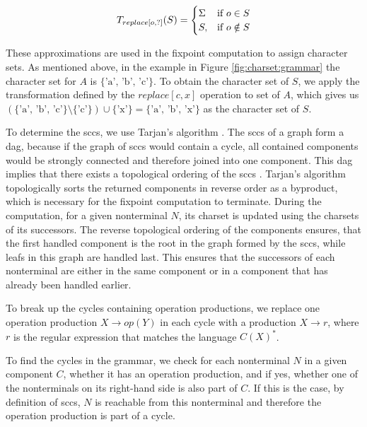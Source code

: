 \begin{align}
	\centering
	T_{replace[o, ?]}(S) = 
	\begin{cases}
		\Sigma & \text{if } o \in S\\
		S, & \text{if } o \notin S
	\end{cases}
	\label{math:replace:unknown}
\end{align}

These approximations are used in the fixpoint computation to assign character sets.
As mentioned above, in the example in Figure \ref{fig:charset:grammar} the character set for $A$ is $\{\text{'a', 'b', 'c'}\}$. To obtain the character set of $S$, we apply the transformation defined by the $replace[c,x]$ operation to set of $A$, which gives us $(\{\text{'a', 'b', 'c'}\} \setminus \{\text{'c'}\}) \cup \{\text{'x'}\} = \{\text{'a', 'b', 'x'}\}$ as the character set of $S$.

To determine the \acp{scc}, we use Tarjan's algorithm \cite{tarjan}.
The \acp{scc} of a graph form a \ac{dag}, because if the graph of \acp{scc} would contain a cycle, all contained components would be strongly connected and therefore joined into one component. This \ac{dag} implies that there exists a topological ordering of the \acp{scc} \cite{mit_algorithms}.
Tarjan's algorithm topologically sorts the returned components in reverse order as a byproduct, which is necessary for the fixpoint computation to terminate.
During the computation, for a given nonterminal $N$, its charset is updated using the charsets of its successors. The reverse topological ordering of the components ensures, that the first handled component is the root in the graph formed by the \acp{scc}, while leafs in this graph are handled last. This ensures that the successors of each nonterminal are either in the same component or in a component that has already been handled earlier.

To break up the cycles containing operation productions, we replace one operation production $X \rightarrow op(Y)$ in each cycle with a production $X \rightarrow r$, where $r$ is the regular expression that matches the language $C(X)^*$.

To find the cycles in the grammar, we check for each nonterminal $N$ in a given component $C$, whether it has an operation production, and if yes, whether one of the nonterminals on its right-hand side is also part of $C$. If this is the case, by definition of \acp{scc}, $N$ is reachable from this nonterminal and therefore the operation production is part of a cycle.

